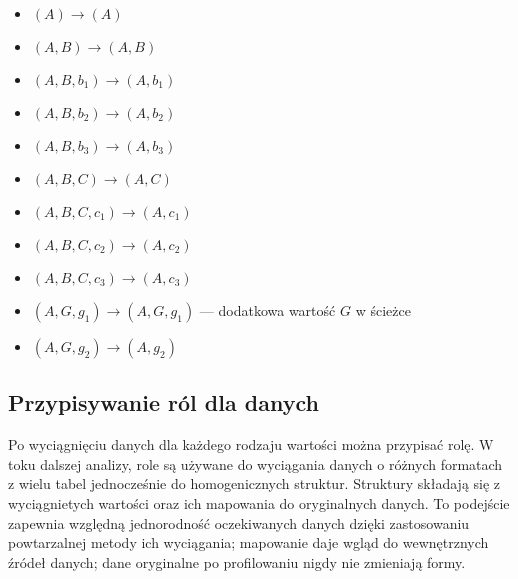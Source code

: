 \begin{itemize}
\item $(A) \to (A)$
\item $(A, B) \to (A, B)$
\item $(A, B, b_1) \to (A, b_1)$
\item $(A, B, b_2) \to (A, b_2)$
\item $(A, B, b_3) \to (A, b_3)$
\item $(A, B, C) \to (A, C)$
\item $(A, B, C, c_1) \to (A, c_1)$
\item $(A, B, C, c_2) \to (A, c_2)$
\item $(A, B, C, c_3) \to (A, c_3)$
\item $(A, G, g_1) \to (A, G, g_1)$ --- 
      dodatkowa wartość $G$ w ścieżce
\item $(A, G, g_2) \to (A, g_2)$
\end{itemize}



\subsection{Przypisywanie ról dla danych}

Po wyciągnięciu danych dla każdego rodzaju wartości można 
przypisać rolę. W toku dalszej analizy, role są używane do
wyciągania danych o różnych formatach z wielu tabel jednocześnie
do homogenicznych struktur. Struktury składają się z wyciągnietych
wartości oraz ich mapowania do oryginalnych danych.
To podejście zapewnia względną jednorodność oczekiwanych danych
dzięki zastosowaniu powtarzalnej metody ich wyciągania;
mapowanie daje wgląd do wewnętrznych źródeł danych; dane oryginalne
po profilowaniu nigdy nie zmieniają formy.

